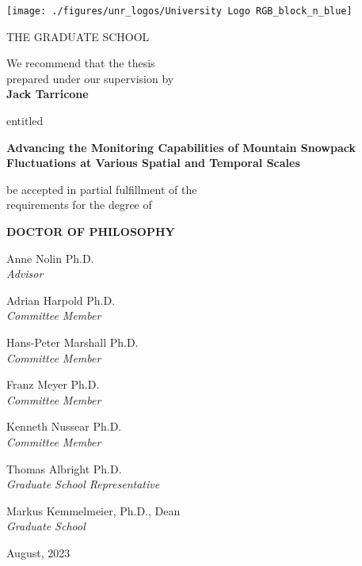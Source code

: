 \documentclass[11pt, oneside, openany]{scrbook}
\begin{document}
\newpage
\thispagestyle{empty}
\begin{center}

\texttt{[image: ./figures/unr\_logos/University Logo RGB\_block\_n\_blue]}

THE GRADUATE SCHOOL

\vspace{1em}
We recommend that the thesis \\
prepared under our supervision by\\

\vspace{1em}
\textbf{Jack Tarricone}

\vspace{1em}
entitled

\textbf{Advancing the Monitoring Capabilities of Mountain Snowpack Fluctuations at Various Spatial and Temporal Scales}

\vspace{2em}
be accepted in partial fulfillment of the \\
requirements for the degree of

\vspace{1em}
\textbf{DOCTOR OF PHILOSOPHY}

\vspace{1em}
Anne Nolin Ph.D. \\
\textit{Advisor}

\vspace{1em}
Adrian Harpold Ph.D. \\
\textit{Committee Member}

\vspace{1em}
Hans-Peter Marshall Ph.D. \\
\textit{Committee Member}

\vspace{1em}
Franz Meyer Ph.D. \\
\textit{Committee Member}

\vspace{1em}
Kenneth Nussear Ph.D. \\
\textit{Committee Member}

\vspace{1em}
Thomas Albright Ph.D. \\
\textit{Graduate School Representative}

\vspace{1em}
Markus Kemmelmeier, Ph.D., Dean\\
\textit{Graduate School}

\vspace{1em}
August, 2023
\end{center}
\setlength{\parindent}{2em} %
\end{document}
